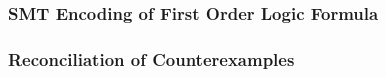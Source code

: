 

\subsubsection{SMT Encoding of First Order Logic Formula}
\label{sec:smtencoding}

\subsubsection{Reconciliation of Counterexamples}
\label{sec:cerecons}